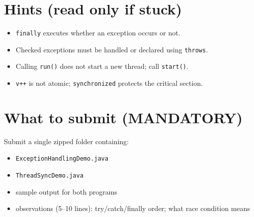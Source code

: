 \documentclass[11pt]{article}
\begin{document}
\section{Hints (read only if stuck)}
\begin{itemize}[leftmargin=*]
  \item \texttt{finally} executes whether an exception occurs or not.
  \item Checked exceptions must be handled or declared using \texttt{throws}.
  \item Calling \texttt{run()} does not start a new thread; call \texttt{start()}.
  \item \texttt{v++} is not atomic; \texttt{synchronized} protects the critical section.
\end{itemize}

\section{What to submit (MANDATORY)}
Submit a single zipped folder containing:
\begin{itemize}[leftmargin=*]
  \item \texttt{ExceptionHandlingDemo.java}
  \item \texttt{ThreadSyncDemo.java}
  \item sample output for both programs
  \item observations (5--10 lines): try/catch/finally order; what race condition means
\end{itemize}

\notesources{\OOPSUnitIIISources}
\end{document}

